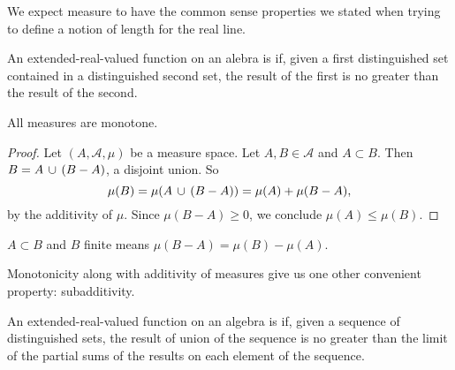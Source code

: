 
\sbasic




















\sstart
{}


We expect measure to have the
common sense properties we stated
when trying to define a notion of
length for the real line.


An extended-real-valued function on an
alebra is
if, given a first distinguished set contained in
a distinguished second set, the result of the
first is no greater than the result of the second.

\begin{prop}
  All measures are monotone.
  \begin{proof}
    Let $(A, \mathcal{A}, \mu)$ be
    a measure space.
    Let $A, B \in \mathcal{A}$
    and $A \subset B$.
    Then $B = A \,\cup\, (B - A)$,
    a disjoint union.
    So
    \[
      \mu(B) = \mu(A \,\cup\, (B - A))= \mu(A) + \mu(B - A),
    \]
    by the additivity of $\mu$.
    Since $\mu(B - A) \geq 0$,
    we conclude $\mu(A) \leq \mu(B)$.
  \end{proof}
\end{prop}

\begin{prop}
  $A \subset B$ and $B$ finite
  means $\mu(B - A) = \mu(B) - \mu(A)$.
\end{prop}



Monotonicity along with additivity of
measures give us one other convenient
property: subadditivity.

An extended-real-valued function on an algebra is
if, given a sequence of distinguished sets, the
result of union of the sequence is no greater than
the limit of the partial sums of the results on
each element of the sequence.

